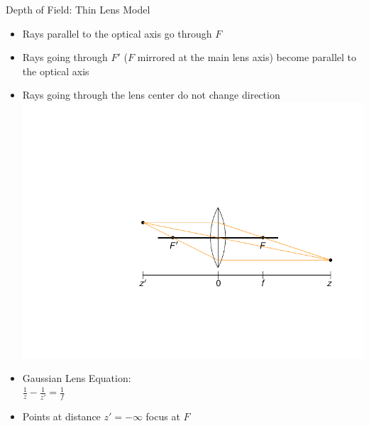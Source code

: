 \documentclass[utf8,stillsansserifmath,fleqn,t]{beamer}
\newcommand{\ds}{\displaystyle}
\begin{document}
\begin{frame}[label=thin-lens]
\frametitle{\insertsection}
Depth of Field: Thin Lens Model
\begin{itemize}
\item Rays parallel to the optical axis go through $F$
\item Rays going through $F'$ ($F$ mirrored at the main lens axis) become
parallel to the optical axis
\item Rays going through the lens center do not change direction\\
\includegraphics[width=.5\textwidth]{./fig/thin-lens-1.pdf}
\item Gaussian Lens Equation:\\
$\ds \frac{1}{z} - \frac{1}{z'} = \frac{1}{f}$
\item Points at distance $z'=-\infty$ focus at $F$
\end{itemize}
\end{frame}
\end{document}
